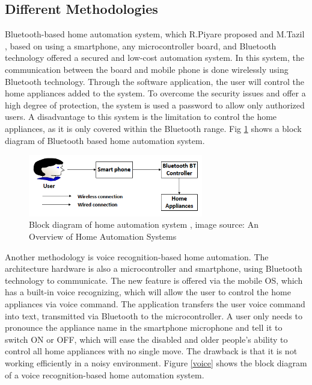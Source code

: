 \documentclass[conference]{IEEEtran}
\begin{document}
 
 \subsection{Different Methodologies }
 
Bluetooth-based home automation system, which R.Piyare proposed and M.Tazil \cite{Tazil} , based on using a  smartphone, any microcontroller board, and Bluetooth technology offered a  secured and low-cost automation system. In this system, the communication between the board and mobile phone is done wirelessly using Bluetooth technology. Through the software application, the user will control the home appliances added to the system. To overcome the security issues and offer a high degree of protection, the system is used a password to allow only authorized users. A disadvantage to this system is the limitation to control the home appliances, as it is only covered within the Bluetooth range. Fig \ref{Blutooth} shows a block diagram of Bluetooth based home automation system. 

\begin{figure}[h!]
	\centering
	\includegraphics[width=3in]{Blutooth.png}
	\caption{\label{Blutooth}  Block diagram of home automation system 
		 , image source: An Overview of Home Automation Systems
		\cite{blutooth} }
\end{figure}


Another methodology is voice recognition-based home automation. The architecture hardware is also a microcontroller and smartphone, using Bluetooth technology to communicate. The new feature is offered via the mobile OS, which has a  built-in voice recognizing, which will allow the user to control the home appliances via voice command. The application transfers the user voice command into text, transmitted via Bluetooth to the microcontroller. A user only needs to pronounce the appliance name in the smartphone microphone and tell it to switch ON or OFF, which will ease the disabled and older people's ability to control all home appliances with no single move. The drawback is that it is not working efficiently in a noisy environment. Figure \ref {voice} shows the block diagram of a voice recognition-based home automation system. 
\end{document}
